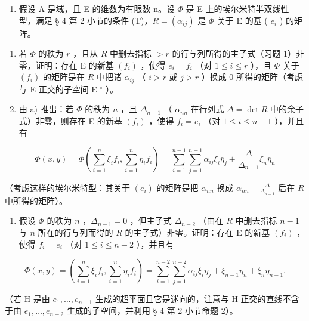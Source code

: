 \begin{enumerate}
\def\labelenumi{\arabic{enumi})}
\setcounter{enumi}{1}
\tightlist
\item
  假设 A 是域，且 E 的维数为有限数 n。设 \(\Phi\) 是 E 上的埃尔米特半双线性型，满足 § 4 第 2 小节的条件 (T)，\(R = (\alpha_{ij})\) 是 \(\Phi\) 关于 E 的基 ( \(e_i\) ) 的矩阵。
\end{enumerate}

\begin{enumerate}
\def\labelenumi{\alph{enumi})}
\item
  若 \(\Phi\) 的秩为 \(r\) ，且从 \(R\) 中删去指标 \(>r\) 的行与列所得的主子式（习题 1）非零，证明：存在 E 的新基 \((f_i)\) ，使得 \(e_i = f_i\) （对 \(1 \leqslant i \leqslant r\) ），且 \(\Phi\) 关于 \((f_i)\) 的矩阵是在 \(R\) 中把诸 \(\alpha_{ij}\) （ \(i > r\) 或 \(j > r\) ）换成 0 所得的矩阵（考虑与 E 正交的子空间 E \(^\circ\) ）。
\item
  由 a) 推出：若 \(\Phi\) 的秩为 \(n\) ，且 \(\Delta_{n-1}\) （ \(\alpha_{nn}\) 在行列式 \(\Delta = \det R\) 中的余子式）非零，则存在 E 的新基 \((f_i)\) ，使得 \(f_i = e_i\) （对 \(1 \leqslant i \leqslant n-1\) ），并且有
\end{enumerate}

\[
\Phi (x, y) = \Phi \left(\sum_ {i = 1} ^ {n} \xi_ {i} f _ {i}, \sum_ {i = 1} ^ {n} \eta_ {i} f _ {i}\right) = \sum_ {i = 1} ^ {n - 1} \sum_ {j = 1} ^ {n - 1} \alpha_ {i j} \xi_ {i} \bar {\eta} _ {j} + \frac {\Delta}{\Delta_ {n - 1}} \xi_ {n} \bar {\eta} _ {n}
\]

（考虑这样的埃尔米特型：其关于 \((e_i)\) 的矩阵是把 \(\alpha_{nn}\) 换成 \(\alpha_{nn} - \frac{\Delta}{\Delta_{n-1}}\) 后在 \(R\) 中所得的矩阵）。

\begin{enumerate}
\def\labelenumi{\alph{enumi})}
\setcounter{enumi}{2}
\tightlist
\item
  假设 \(\Phi\) 的秩为 \(n\) ，\(\Delta_{n-1} = 0\) ，但主子式 \(\Delta_{n-2}\) （由在 \(R\) 中删去指标 \(n-1\) 与 \(n\) 所在的行与列而得的 \(R\) 的主子式）非零。证明：存在 E 的新基 \((f_i)\) ，使得 \(f_i = e_i\) （对 \(1 \leqslant i \leqslant n-2\) ），并且有
\end{enumerate}

\[
\Phi (x, y) = (\sum_ {i = 1} ^ {n} \xi_ {i} f _ {i}, \sum_ {i = 1} ^ {n} \eta_ {i} f _ {i}) = \sum_ {i = 1} ^ {n - 2} \sum_ {j = 1} ^ {n - 2} \alpha_ {i j} \xi_ {i} \bar {\eta} _ {j} + \xi_ {n - 1} \bar {\eta} _ {n} + \xi_ {n} \bar {\eta} _ {n - 1}.
\]

（若 H 是由 \(e_{1},\ldots,e_{n-1}\) 生成的超平面且它是迷向的，注意与 H 正交的直线不含于由 \(e_{1},\ldots,e_{n-2}\) 生成的子空间，并利用 § 4 第 2 小节命题 2）。

